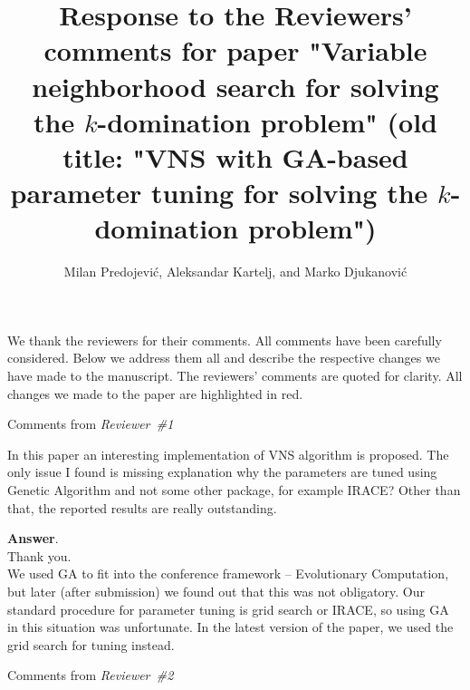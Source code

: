 \documentclass [11pt]{scrartcl}
\title{\Large{Response to the Reviewers' comments for paper "Variable neighborhood search for solving the $k$-domination problem" (old title: "VNS with GA-based parameter tuning for solving the $k$-domination problem")} }
\author{{Milan Predojević}, {Aleksandar Kartelj}, and {Marko Djukanović} }
\begin{document}
\maketitle 

We thank the reviewers for their comments. All comments have been carefully considered. Below we address them all and describe the respective changes we have made to the manuscript. The reviewers' comments are quoted for clarity. All changes we made to the paper are highlighted in red.
  
\begin{center} 
Comments from \textit{Reviewer\ \#1}
\end{center}

\begin{leftbar}

In this paper an interesting implementation of VNS algorithm is proposed. The only issue I found is missing explanation why the parameters are tuned using Genetic Algorithm and not some other package, for example IRACE? Other than that, the reported results are really outstanding.

\end{leftbar}
\textbf{Answer}. \\
 Thank you. \\
We used GA to fit into the conference framework -- Evolutionary Computation, but later (after submission) we found out that this was not obligatory. 
Our standard procedure for parameter tuning is grid search or IRACE, so using GA in this situation was unfortunate. In the latest version of the paper, we used the grid search for tuning instead.
 
\begin{center} 
	Comments from \textit{Reviewer\ \#2}
\end{center}
\end{document}
